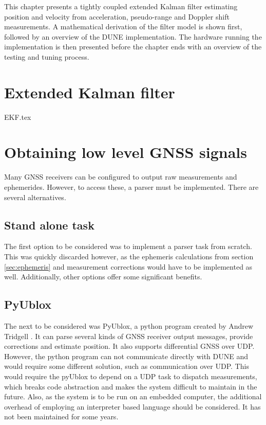 \graphicspath{{Implementation/}}
\label{ch:implementation}

This chapter presents a tightly coupled extended Kalman filter estimating position and velocity from acceleration, pseudo-range and Doppler shift measurements. A mathematical derivation of the filter model is shown first, followed by an overview of the DUNE implementation. The hardware running the implementation is then presented before the chapter ends with an overview of the testing and tuning process.

\section{Extended Kalman filter}
\label{sec:imp:ekf}
    {EKF.tex}

\section{Obtaining low level GNSS signals}
    Many GNSS receivers can be configured to output raw measurements and ephemerides. However, to access these, a parser must be implemented. There are several alternatives.\\ 
    
    \subsection{Stand alone task}
    The first option to be considered was to implement a parser task from scratch. This was quickly discarded however, as the ephemeris calculations from section \ref{sec:ephemeris} and measurement corrections would have to be implemented as well. Additionally, other options offer some significant benefits.\\
    
    \subsection{PyUblox}
    The next to be considered was PyUblox, a python program created by Andrew Tridgell \cite{pyublox}. It can parse several kinds of GNSS receiver output messages, provide corrections and estimate position. It also supports differential GNSS over UDP. However, the python program can not communicate directly with DUNE and would require some different solution, such as communication over UDP. This would require the pyUblox to depend on a UDP task to dispatch measurements, which breaks code abstraction and makes the system difficult to maintain in the future. Also, as the system is to be run on an embedded computer, the additional overhead of employing an interpreter based language should be considered. It has not been maintained for some years.\\
    
